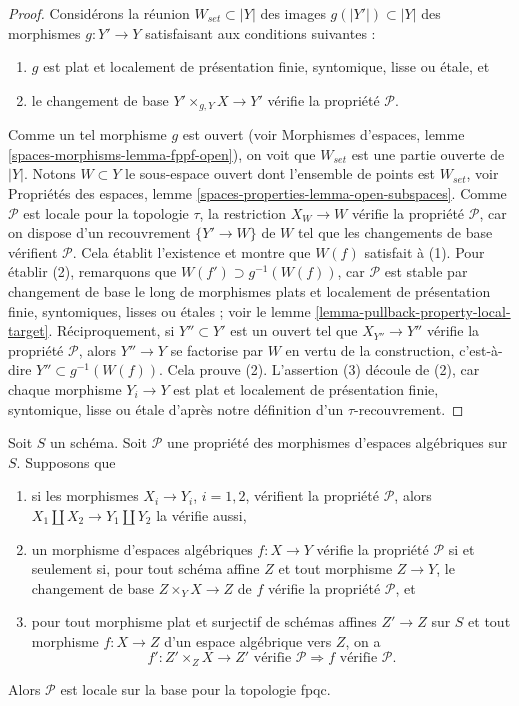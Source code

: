 \begin{proof}
Considérons la réunion $W_{set} \subset |Y|$ des images
$g(|Y'|) \subset |Y|$ des morphismes $g : Y' \to Y$ satisfaisant aux conditions suivantes :
\begin{enumerate}
\item $g$ est plat et localement de présentation finie, syntomique,
lisse ou \'etale, et
\item le changement de base $Y' \times_{g, Y} X \to Y'$ vérifie la propriété
$\mathcal{P}$.
\end{enumerate}
Comme un tel morphisme $g$ est ouvert (voir
Morphismes d'espaces, lemme \ref{spaces-morphisms-lemma-fppf-open}),
on voit que $W_{set}$ est une partie ouverte de $|Y|$. Notons $W \subset Y$
le sous-espace ouvert dont l'ensemble de points est $W_{set}$, voir
Propriétés des espaces, lemme \ref{spaces-properties-lemma-open-subspaces}.
Comme $\mathcal{P}$ est locale pour la topologie $\tau$, la restriction
$X_W \to W$ vérifie la propriété $\mathcal{P}$, car on dispose d'un recouvrement
$\{Y' \to W\}$ de $W$ tel que les changements de base vérifient $\mathcal{P}$.
Cela établit l'existence et montre que $W(f)$ satisfait à (1).
Pour établir (2), remarquons que $W(f') \supset g^{-1}(W(f))$, car
$\mathcal{P}$ est stable par changement de base le long de morphismes plats et localement de
présentation finie, syntomiques, lisses ou \'etales ; voir
le lemme \ref{lemma-pullback-property-local-target}.
Réciproquement, si $Y'' \subset Y'$ est un ouvert tel que
$X_{Y''} \to Y''$ vérifie la propriété $\mathcal{P}$, alors $Y'' \to Y$ se factorise
par $W$ en vertu de la construction, c'est-à-dire $Y'' \subset g^{-1}(W(f))$. Cela
prouve (2). L'assertion (3) découle de (2), car chaque morphisme
$Y_i \to Y$ est plat et localement de présentation finie, syntomique,
lisse ou \'etale d'après notre définition d'un $\tau$-recouvrement.
\end{proof}

\begin{lemma}
\label{lemma-descending-properties-morphisms}
Soit $S$ un schéma. Soit $\mathcal{P}$ une propriété des morphismes
d'espaces algébriques sur $S$. Supposons que
\begin{enumerate}
\item si les morphismes $X_i \to Y_i$, $i = 1, 2$, vérifient la propriété $\mathcal{P}$, alors
$X_1 \amalg X_2 \to Y_1 \amalg Y_2$ la vérifie aussi,
\item un morphisme d'espaces algébriques $f : X \to Y$ vérifie la propriété
$\mathcal{P}$ si et seulement si, pour tout schéma affine $Z$ et tout
morphisme $Z \to Y$, le changement de base $Z \times_Y X \to Z$ de $f$
vérifie la propriété $\mathcal{P}$, et
\item pour tout morphisme plat et surjectif de schémas affines
$Z' \to Z$ sur $S$ et tout morphisme $f : X \to Z$ d'un espace algébrique
vers $Z$, on a
$$
f' : Z' \times_Z X \to Z'\text{ vérifie }\mathcal{P}
\Rightarrow
f\text{ vérifie }\mathcal{P}.
$$
\end{enumerate}
Alors $\mathcal{P}$ est locale sur la base pour la topologie fpqc.
\end{lemma}

